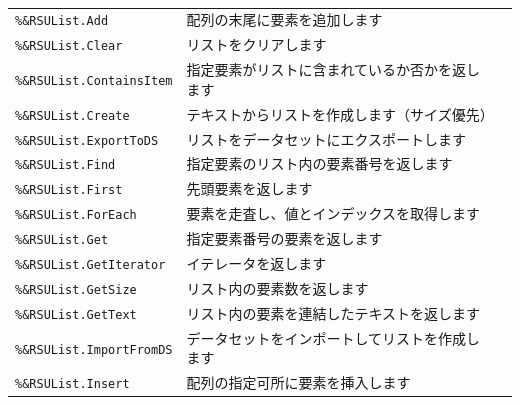 \paragraph{\DocStrTitleRDMPackageFunctionList}
\begin{center}
{\footnotesize
\begin{xltabular}{\textwidth}{|p{4truecm}|X|p{1.2truecm}|}
\hline
\thead{\DocStrHeaderFunctionName}&\thead{\DocStrDescription}&\thead{\DocStrRefto}\\
\hline
\hline
\texttt{\%\&RSUList.Add}&配列の末尾に要素を追加します&\\
\hline
\texttt{\%\&RSUList.Clear}&リストをクリアします&\\
\hline
\texttt{\%\&RSUList.ContainsItem}&指定要素がリストに含まれているか否かを返します&\\
\hline
\texttt{\%\&RSUList.Create}&テキストからリストを作成します（サイズ優先）&\\
\hline
\texttt{\%\&RSUList.ExportToDS}&リストをデータセットにエクスポートします&\\
\hline
\texttt{\%\&RSUList.Find}&指定要素のリスト内の要素番号を返します&\\
\hline
\texttt{\%\&RSUList.First}&先頭要素を返します&\\
\hline
\texttt{\%\&RSUList.ForEach}&要素を走査し、値とインデックスを取得します&\\
\hline
\texttt{\%\&RSUList.Get}&指定要素番号の要素を返します&\\
\hline
\texttt{\%\&RSUList.GetIterator}&イテレータを返します&\\
\hline
\texttt{\%\&RSUList.GetSize}&リスト内の要素数を返します&\\
\hline
\texttt{\%\&RSUList.GetText}&リスト内の要素を連結したテキストを返します&\\
\hline
\texttt{\%\&RSUList.ImportFromDS}&データセットをインポートしてリストを作成します&\\
\hline
\texttt{\%\&RSUList.Insert}&配列の指定可所に要素を挿入します&\\

\end{xltabular}}
\end{center}
